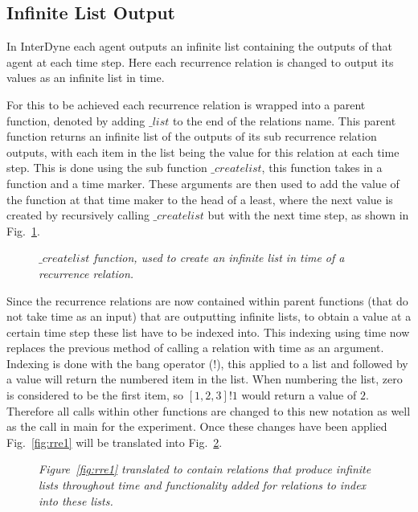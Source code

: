 \documentclass{article}
\begin{document}
\subsection{Infinite List Output}
In InterDyne each agent outputs an infinite list containing the outputs of that agent at each time step. Here each recurrence relation is changed to output its values as an infinite list in time.

For this to be achieved each recurrence relation is wrapped into a parent function, denoted by adding $\_list$ to the end of the relations name. This parent function returns an infinite list of the outputs of its sub recurrence relation outputs, with each item in the list being the value for this relation at each time step. This is done using the sub function $\_createlist$, this function takes in a function and a time marker. These arguments are then used to add the value of the function at that time maker to the head of a least, where the next value is created by recursively calling $\_createlist$ but with the next time step, as shown in Fig.~\ref{fig:cl1}.
\begin{figure}[H]
	\centering
	
	\caption{\it $\_createlist$ function, used to create an infinite list in time of a recurrence relation.}
	\label{fig:cl1}
\end{figure} 
 
Since the recurrence relations are now contained within parent functions (that do not take time as an input) that are outputting infinite lists, to obtain a value at a certain time step these list have to be indexed into. This indexing using time now replaces the previous method of calling a relation with time as an argument. Indexing is done with the bang operator ($!$), this applied to a list and followed by a value will return the numbered item in the list. When numbering the list, zero is considered to be the first item, so $[1,2,3]!1$ would return a value of $2$. Therefore all calls within other functions are changed to this new notation as well as the call in main for the experiment. Once these changes have been applied Fig.~\ref{fig:rre1} will be translated into Fig.~\ref{fig:ts1}.
\begin{figure}[H]
	\centering
	
	\caption{\it Figure~\ref{fig:rre1} translated to contain relations that produce infinite lists throughout time and functionality added for relations to index into these lists.  }
	\label{fig:ts1}
\end{figure} 
\end{document}
